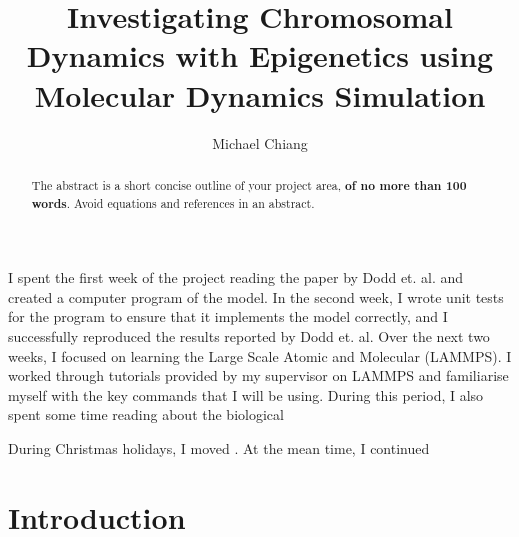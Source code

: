 \documentclass[12pt]{article}
\begin{document}
\title{Investigating Chromosomal Dynamics with Epigenetics using Molecular Dynamics Simulation} %
\author{Michael Chiang} %

\begin{abstract}
The abstract is a short concise outline of your project area, {\bf of no more than 100 words}. Avoid equations and references in an abstract. 
\end{abstract}

\maketitle

\personalstatement
I spent the first week of the project reading the paper by Dodd et. al. and created a computer program of the model. In the second week, I wrote unit tests for the program to ensure that it implements the model correctly, and I successfully reproduced the results reported by Dodd et. al. Over the next two weeks, I focused on learning the Large Scale Atomic and Molecular (LAMMPS). I worked through tutorials provided by my supervisor on LAMMPS and familiarise myself with the key commands that I will be using.  During this period, I also spent some time reading about the biological 

During Christmas holidays, I moved . At the mean time, I continued 


\maintext


\section{Introduction}

\end{document}
